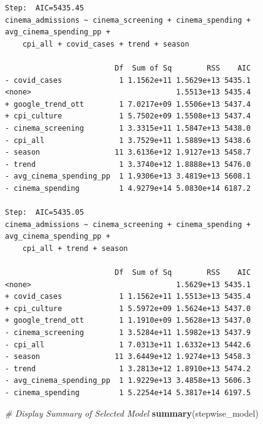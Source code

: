 \documentclass[
]{article}
\newenvironment{Shaded}{\begin{snugshade}}{\end{snugshade}}
\newcommand{\CommentTok}[1]{\textcolor[rgb]{0.56,0.35,0.01}{\textit{#1}}}
\newcommand{\FunctionTok}[1]{\textcolor[rgb]{0.13,0.29,0.53}{\textbf{#1}}}
\newcommand{\NormalTok}[1]{#1}
\begin{document}
\begin{verbatim}
Step:  AIC=5435.45
cinema_admissions ~ cinema_screening + cinema_spending + avg_cinema_spending_pp + 
    cpi_all + covid_cases + trend + season

                         Df  Sum of Sq        RSS    AIC
- covid_cases             1 1.1562e+11 1.5629e+13 5435.1
<none>                                 1.5513e+13 5435.4
+ google_trend_ott        1 7.0217e+09 1.5506e+13 5437.4
+ cpi_culture             1 5.7502e+09 1.5508e+13 5437.4
- cinema_screening        1 3.3315e+11 1.5847e+13 5438.0
- cpi_all                 1 3.7529e+11 1.5889e+13 5438.6
- season                 11 3.6136e+12 1.9127e+13 5458.7
- trend                   1 3.3740e+12 1.8888e+13 5476.0
- avg_cinema_spending_pp  1 1.9306e+13 3.4819e+13 5608.1
- cinema_spending         1 4.9279e+14 5.0830e+14 6187.2

Step:  AIC=5435.05
cinema_admissions ~ cinema_screening + cinema_spending + avg_cinema_spending_pp + 
    cpi_all + trend + season

                         Df  Sum of Sq        RSS    AIC
<none>                                 1.5629e+13 5435.1
+ covid_cases             1 1.1562e+11 1.5513e+13 5435.4
+ cpi_culture             1 5.5972e+09 1.5624e+13 5437.0
+ google_trend_ott        1 1.1910e+09 1.5628e+13 5437.0
- cinema_screening        1 3.5284e+11 1.5982e+13 5437.9
- cpi_all                 1 7.0313e+11 1.6332e+13 5442.6
- season                 11 3.6449e+12 1.9274e+13 5458.3
- trend                   1 3.2813e+12 1.8910e+13 5474.2
- avg_cinema_spending_pp  1 1.9229e+13 3.4858e+13 5606.3
- cinema_spending         1 5.2254e+14 5.3817e+14 6197.5
\end{verbatim}

\begin{Shaded}
\begin{Highlighting}[]
\CommentTok{\# Display Summary of Selected Model}
\FunctionTok{summary}\NormalTok{(stepwise\_model)}
\end{Highlighting}
\end{Shaded}
\end{document}
